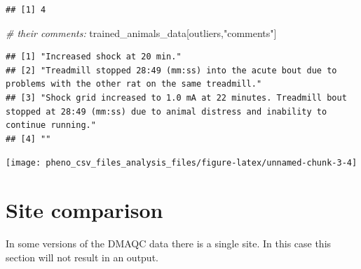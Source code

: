 \documentclass[]{article}
\newenvironment{Shaded}{\begin{snugshade}}{\end{snugshade}}
\newcommand{\KeywordTok}[1]{\textcolor[rgb]{0.13,0.29,0.53}{\textbf{#1}}}
\newcommand{\DataTypeTok}[1]{\textcolor[rgb]{0.13,0.29,0.53}{#1}}
\newcommand{\DecValTok}[1]{\textcolor[rgb]{0.00,0.00,0.81}{#1}}
\newcommand{\StringTok}[1]{\textcolor[rgb]{0.31,0.60,0.02}{#1}}
\newcommand{\CommentTok}[1]{\textcolor[rgb]{0.56,0.35,0.01}{\textit{#1}}}
\newcommand{\OperatorTok}[1]{\textcolor[rgb]{0.81,0.36,0.00}{\textbf{#1}}}
\newcommand{\NormalTok}[1]{#1}
\begin{document}
\begin{verbatim}
## [1] 4
\end{verbatim}

\begin{Shaded}
\begin{Highlighting}[]
\CommentTok{# their comments:}
\NormalTok{trained_animals_data[outliers,}\StringTok{"comments"}\NormalTok{]}
\end{Highlighting}
\end{Shaded}

\begin{verbatim}
## [1] "Increased shock at 20 min."                                                                                                                     
## [2] "Treadmill stopped 28:49 (mm:ss) into the acute bout due to problems with the other rat on the same treadmill."                                  
## [3] "Shock grid increased to 1.0 mA at 22 minutes. Treadmill bout stopped at 28:49 (mm:ss) due to animal distress and inability to continue running."
## [4] ""
\end{verbatim}

\begin{Shaded}
\end{Shaded}

\texttt{[image: pheno\_csv\_files\_analysis\_files/figure-latex/unnamed-chunk-3-4]}

\section{Site comparison}\label{site-comparison}

In some versions of the DMAQC data there is a single site. In this case
this section will not result in an output.
\end{document}
